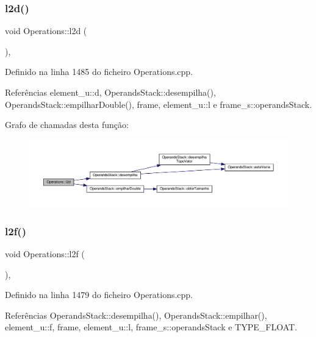 \subsubsection{\texorpdfstring{l2d()}{l2d()}}
{\footnotesize\ttfamily void Operations\+::l2d (\begin{DoxyParamCaption}{ }\end{DoxyParamCaption})\hspace{0.3cm}{\ttfamily [static]}, {\ttfamily [private]}}



Definido na linha 1485 do ficheiro Operations.\+cpp.



Referências element\+\_\+u\+::d, Operands\+Stack\+::desempilha(), Operands\+Stack\+::empilhar\+Double(), frame, element\+\_\+u\+::l e frame\+\_\+s\+::operands\+Stack.

Grafo de chamadas desta função\+:\nopagebreak
\begin{figure}[H]
\begin{center}
\leavevmode
\includegraphics[width=350pt]{classOperations_aab1532a2f22ab943a1ec37e33ae742b3_cgraph}
\end{center}
\end{figure}
\mbox{\label{classOperations_af2064cce9ba6f6a4be257354f21f537e}} 
\subsubsection{\texorpdfstring{l2f()}{l2f()}}
{\footnotesize\ttfamily void Operations\+::l2f (\begin{DoxyParamCaption}{ }\end{DoxyParamCaption})\hspace{0.3cm}{\ttfamily [static]}, {\ttfamily [private]}}



Definido na linha 1479 do ficheiro Operations.\+cpp.



Referências Operands\+Stack\+::desempilha(), Operands\+Stack\+::empilhar(), element\+\_\+u\+::f, frame, element\+\_\+u\+::l, frame\+\_\+s\+::operands\+Stack e T\+Y\+P\+E\+\_\+\+F\+L\+O\+AT.

